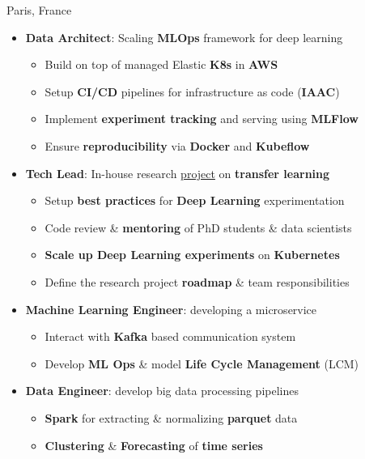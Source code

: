 \documentclass[10pt,a4paper,ragged2e]{altacv}
\begin{document}
     {Paris, France}
\begin{itemize}
	\item \textbf{Data Architect}: Scaling \textbf{MLOps} framework for deep learning
	\vspace{0.3em}
	\begin{itemize}
		\item Build on top of managed Elastic \textbf{K8s} in \textbf{AWS}
		\item Setup \textbf{CI/CD} pipelines for infrastructure as code (\textbf{IAAC}) 
		\item Implement \textbf{experiment tracking} and serving using \textbf{MLFlow}
		\item Ensure \textbf{reproducibility} via \textbf{Docker} and \textbf{Kubeflow}
	\end{itemize}
    \item \textbf{Tech Lead}: In-house research \href{https://github.com/EricssonResearch/UDA-4-TSC}{project} on \textbf{transfer learning}
    \vspace{0.3em}
    \begin{itemize}
    	\item[-] Setup \textbf{best practices} for \textbf{Deep Learning} experimentation
        \item[-] Code review \& \textbf{mentoring} of PhD students \& data scientists
        \item[-] \textbf{Scale up Deep Learning experiments} on \textbf{Kubernetes}
        \item[-] Define the research project \textbf{roadmap} \& team responsibilities
    \end{itemize}
    \item \textbf{Machine Learning Engineer}: developing a microservice
    \vspace{0.3em}
    \begin{itemize}
        \item[-] Interact with \textbf{Kafka} based communication system 
        \item[-] Develop \textbf{ML Ops} \& model \textbf{Life Cycle Management} (LCM)
    \end{itemize}
	
	\item \textbf{Data Engineer}: develop big data processing pipelines 
	\vspace{0.3em}
	\begin{itemize}
		\item[-] \textbf{Spark} for extracting \& normalizing \textbf{parquet} data
		\item[-] \textbf{Clustering} \& \textbf{Forecasting} of \textbf{time series} 
	\end{itemize}
	
\end{itemize}
\end{document}
